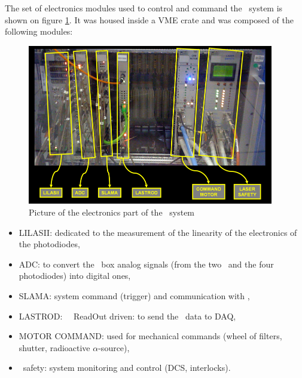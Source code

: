 \begin{itemize}
	The set of electronics modules used to control and command the \lasa~system is shown on figure \ref{fig:lasaelectronics}. It was housed inside a VME crate and was composed of the following modules:
	\begin{figure}[htbp]
			\centering
			\includegraphics[height=7cm]{figures/Electronics.png}
			\caption{Picture of the electronics part of the \lasi~system}\label{fig:lasaelectronics}
		\end{figure}	
		
	\begin{itemize}
	\item {\sc LILASII}: dedicated to the measurement of the linearity of the electronics of the photodiodes,
	\item {\sc ADC}: to convert the \las~box analog signals (from the two \pmts~and the four photodiodes) into digital ones,
	\item {\sc SLAMA}: system command (trigger) and communication with \atlas,
	\item {\sc LASTROD}: \las~\tilecal~ReadOut driven: to send the \las~data to \atlas DAQ,
	\item {\sc MOTOR COMMAND}: used for mechanical commands (wheel of filters, shutter, radioactive $\alpha$-source),
	\item \las~safety: system monitoring and control (DCS, interlocks).
	\end{itemize}
	
\end{itemize}



